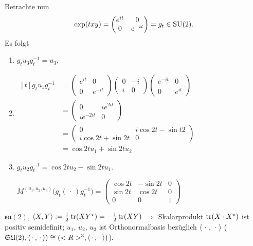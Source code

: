 \begin{example}
\begin{enumerate}[label={(\arabic*)}]
		Betrachte nun \begin{align*}
			\exp(t xy) = \begin{pmatrix}
				e^{it} & 0\\0 & e^{-it}
			\end{pmatrix} = g_t\in\operatorname{SU}(2).
		\end{align*}
		Es folgt \begin{enumerate}[label={\roman*)}]
			\item $g_t u_3 g_t^{-1} = u_3$,
			\item $\displaystyle \begin{aligned}[t]g_t u_1 g_t^{-1} &= \begin{pmatrix}
				e^{it} & 0 \\ 0 & e^{-it}
			\end{pmatrix}\begin{pmatrix}
				0 & -i \\ i & 0
			\end{pmatrix}\begin{pmatrix}
				e^{-it} & 0 \\ 0 & e^{it}
			\end{pmatrix}\\
			&=\begin{pmatrix}
				0 & ie^{2it} \\ ie^{-2it} & 0
			\end{pmatrix}\\
			&=\begin{pmatrix}
				0 & i\cos 2t - \sin t2 \\ i\cos 2t + \sin 2t & 0
			\end{pmatrix}\\
			&= \cos 2t u_1 + \sin 2t u_2\end{aligned}$
			\item $g_t u_2 g_t^{-1} = \cos 2t u_2 - \sin 2t u_1$.
			
			$M^{(u_1,u_2,u_3)}\big( g_t(\,\cdot\,)g_t^{-1}\big) = \begin{pmatrix}
				\cos 2t & -\sin 2t & 0 \\ \sin 2t & \cos 2t & 0 \\ 0 & 0 & 1
			\end{pmatrix}$
		\end{enumerate}
		$\mathfrak{su}(2)$, $\langle X,Y\rangle := \frac12\operatorname{tr}(X Y^\star) = -\frac12\operatorname{tr}(XY)$ $\Rightarrow$ Skalarprodukt $\operatorname{tr}(X\cdot X^\star)$ ist positiv semidefinit; $u_1$, $u_2$, $u_3$ ist Orthonormalbasis bezüglich $\langle\,\cdot\,,\,\cdot\,\rangle$ ($\mathfrak{SU}(2),\langle\,\cdot\,,\,\cdot\,\rangle)\cong(<R>^3,\langle\,\cdot\,,\,\cdot\,\rangle)$).
		

\end{enumerate}
\end{example}
